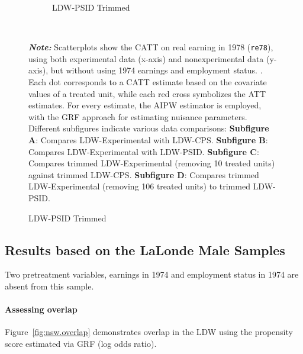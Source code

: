 \documentclass[letterpaper,12pt,leqno]{article}
\begin{document}
\begin{figure}[!ht]
\begin{minipage}[c]{1\textwidth}
\begin{subfigure}{0.4\linewidth}
            \caption{LDW-PSID Trimmed}
        \end{subfigure}
    \end{minipage}%
    \\\raggedright
     {\footnotesize\textbf{\textit{Note:}} Scatterplots show the CATT on real earning in 1978 (\texttt{re78}), using both experimental data (x-axis) and nonexperimental data (y-axis), but without using 1974 earnings and employment status. . Each dot corresponds to a CATT estimate based on the covariate values of a treated unit, while each red cross symbolizes the ATT estimates. For every estimate, the AIPW estimator is employed, with the GRF approach for estimating nuisance parameters. Different subfigures indicate various data comparisons: \textbf{Subfigure A}: Compares LDW-Experimental with LDW-CPS. \textbf{Subfigure B}: Compares LDW-Experimental with LDW-PSID. \textbf{Subfigure C}: Compares trimmed LDW-Experimental (removing 10 treated units) against trimmed LDW-CPS. \textbf{Subfigure D}: Compares trimmed LDW-Experimental (removing 106 treated units) to trimmed LDW-PSID.}
\end{figure}
\clearpage


\FloatBarrier

\clearpage

\subsection{Results based on the LaLonde Male Samples}

Two pretreatment variables, earnings in 1974 and employment status in 1974 are absent from this sample.

\paragraph{Assessing overlap} Figure~\ref{fig:nsw.overlap} demonstrates overlap in the LDW using the propensity score estimated via GRF (log odds ratio). 
\end{document}
